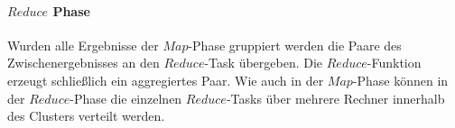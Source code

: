 \paragraph{$Reduce$ Phase}$\;$ \\
Wurden alle Ergebnisse der $Map$-Phase gruppiert werden die Paare des Zwischenergebnisses an den $Reduce$-Task übergeben. Die $Reduce$-Funktion erzeugt schließlich ein aggregiertes Paar. Wie auch in der $Map$-Phase können in der $Reduce$-Phase die einzelnen $Reduce$-Tasks über mehrere Rechner innerhalb des Clusters verteilt werden.

